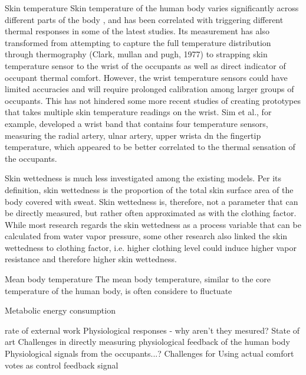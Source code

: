 	Skin temperature
	Skin temperature of the human body varies significantly across different parts of the body \cite{choi_cobi:_2010}, and has been correlated with triggering different thermal responses in some of the latest studies. Its measurement has also transformed from attempting to capture the full temperature distribution through thermography (Clark, mullan and pugh, 1977) to strapping skin temperature sensor to the wrist of the occupants \cite{choi_investigation_2017,liu_personal_2019} as well as direct indicator of occupant thermal comfort. However, the wrist temperature sensors could have limited accuracies \cite{mccarthy_validation_2016} and will require prolonged calibration among larger groups of occupants. This has not hindered some more recent studies of creating prototypes that takes multiple skin temperature readings on the wrist. Sim et al., for example, developed a wrist band that contains four temperature sensors, measuring the radial artery, ulnar artery, upper wrista dn the fingertip temperature, which appeared to be better correlated to the thermal sensation of the occupants.

	Skin wettedness is much less investigated among the existing models. Per its definition, skin wettedness is the proportion of the total skin surface area of the body covered with sweat. Skin wettedness is, therefore, not a parameter that can be directly measured, but rather often approximated as with the clothing factor\cite{mcintyre_subjective_1972}. While most research regards the skin wettedness as a process variable that can be calculated from water vapor pressure\cite{doherty_evaluation_1988}, some other research also linked the skin wettedness to clothing factor, i.e. higher clothing level could induce higher vapor resistance and therefore higher skin wettedness\cite{havenith_personal_2002}. 

	Mean body temperature
	The mean body temperature, similar to the core temperature of the human body, is often considere to fluctuate 

	Metabolic energy consumption

	rate of external work
        Physiological responses - why aren't they mesured?
        State of art
        Challenges in directly measuring physiological feedback of the human body
	Physiological signals from the occupants...?
	    Challenges for Using actual comfort votes as control feedback signal

